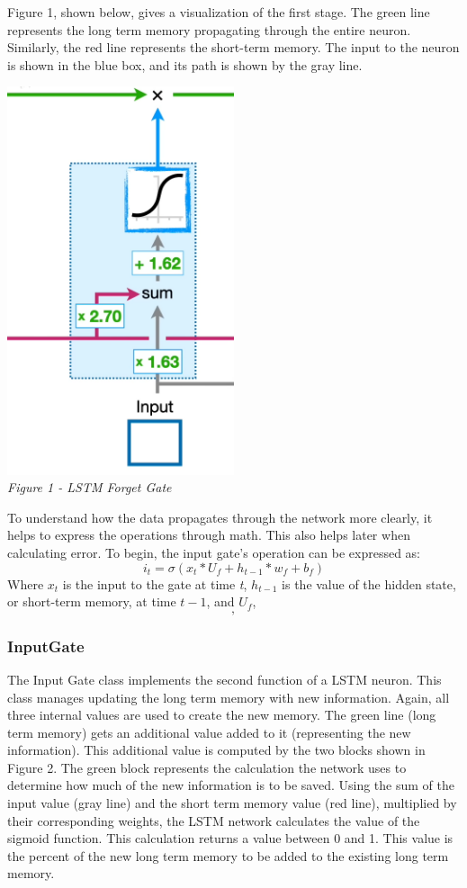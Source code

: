 \documentclass[12pt]{article}
\begin{document}
Figure 1, shown below, gives a visualization of the first stage. The green line
represents the long term memory propagating through the entire neuron.
Similarly, the red line represents the short-term memory. The input to the
neuron is shown in the blue box, and its path is shown by the gray line.

\begin{center}
    \includegraphics[width=0.5\textwidth]{ForgetGate.png}\\
    \emph{Figure 1 - LSTM Forget Gate}
\end{center}
To understand how the data propagates through the network more clearly, it
helps to express the operations through math. This also helps later when
calculating error. To begin, the input gate's operation can be expressed as:
\begin{equation}
    i_t = \sigma(x_t*U_f + h_{t-1}*w_f + b_f)
\end{equation}
Where $x_t$ is the input to the gate at time \emph{t}, $h_{t-1}$ is the value of the hidden state, or short-term memory, at time $t - 1$, and $U_f$, $$, $$
\subsubsection{InputGate}

The Input Gate class implements the second function of a LSTM neuron. This
class manages updating the long term memory with new information. Again, all
three internal values are used to create the new memory. The green line (long
term memory) gets an additional value added to it (representing the new
information). This additional value is computed by the two blocks shown in
Figure 2. The green block represents the calculation the network uses to
determine how much of the new information is to be saved. Using the sum of the
input value (gray line) and the short term memory value (red line), multiplied
by their corresponding weights, the LSTM network calculates the value of the
sigmoid function. This calculation returns a value between 0 and 1. This value
is the percent of the new long term memory to be added to the existing long
term memory.
\end{document}
